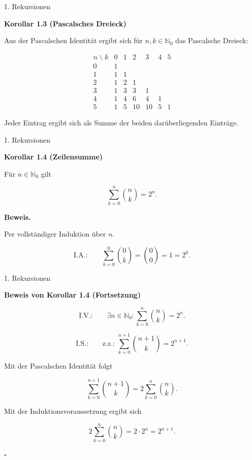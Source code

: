 \documentclass{beamer}
\begin{document}
\begin{frame}{1. Rekursionen}

\textbf{Korollar 1.3 (Pascalsches Dreieck)}

\vspace{0.3cm}

Aus der Pascalschen Identität ergibt sich für
\(n,k\in\mathbb{N}_0\) das Pascalsche Dreieck:

\[
\begin{array}{c|cccccc}
n\backslash k & 0 & 1 & 2 & 3 & 4 & 5\\
\hline
0 & 1\\
1 & 1 & 1\\
2 & 1 & 2 & 1\\
3 & 1 & 3 & 3 & 1\\
4 & 1 & 4 & 6 & 4 & 1\\
5 & 1 & 5 & 10 & 10 & 5 & 1
\end{array}
\]

\vspace{0.2cm}

Jeder Eintrag ergibt sich als Summe der beiden darüberliegenden Einträge.

\end{frame}

\begin{frame}{1. Rekursionen}

\textbf{Korollar 1.4 (Zeilensumme)}

\vspace{0.3cm}

Für \(n\in\mathbb N_0\) gilt

\[
\sum_{k=0}^{n}\binom{n}{k}=2^n.
\]

\vspace{0.5cm}

\textbf{Beweis.}

Per vollständiger Induktion über \(n\).

\[
\text{I.A.:}\qquad
\sum_{k=0}^{0}\binom{0}{k}
=
\binom{0}{0}
=
1
=
2^0.
\]

\end{frame}

\begin{frame}{1. Rekursionen}

\textbf{Beweis von Korollar 1.4 (Fortsetzung)}

\vspace{0.2cm}

\[
\text{I.V.:}\qquad
\exists n\in\mathbb N_0:
\sum_{k=0}^{n}\binom{n}{k}
=
2^n.
\]

\vspace{0.3cm}

\[
\text{I.S.:}\qquad
\text{z.z.: }
\sum_{k=0}^{n+1}\binom{n+1}{k}
=
2^{n+1}.
\]

Mit der Pascalschen Identität folgt

\[
\sum_{k=0}^{n+1}\binom{n+1}{k}
=
2\sum_{k=0}^{n}\binom{n}{k}.
\]

Mit der Induktionsvoraussetzung ergibt sich

\[
2\sum_{k=0}^{n}\binom{n}{k}
=
2\cdot 2^n
=
2^{n+1}.
\]

\hfill\(\square\)

\end{frame}
\end{document}
